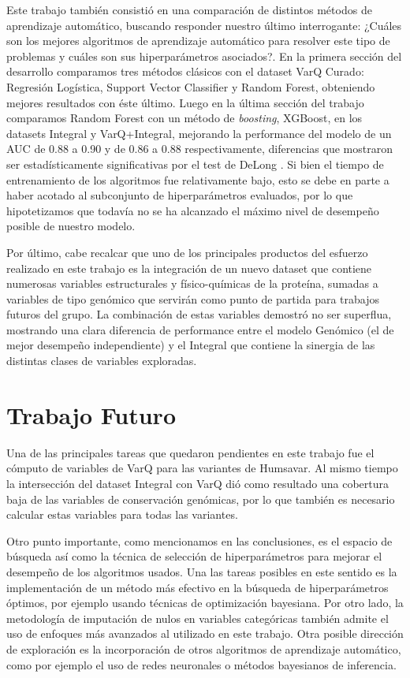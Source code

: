 Este trabajo también consistió en una comparación de distintos métodos de aprendizaje automático, buscando responder nuestro último interrogante: ¿Cuáles son los mejores algoritmos de aprendizaje automático para resolver este tipo de problemas y cuáles son sus hiperparámetros asociados?. En la primera sección del desarrollo comparamos tres métodos clásicos con el dataset VarQ Curado: Regresión Logística, Support Vector Classifier y Random Forest, obteniendo mejores resultados con éste último. Luego en la última sección del trabajo comparamos Random Forest con un método de \textit{boosting}, XGBoost, en los datasets Integral y VarQ+Integral, mejorando la performance del modelo de un AUC de 0.88 a 0.90 y de 0.86 a 0.88 respectivamente, diferencias que mostraron ser estadísticamente significativas por el test de DeLong \cite{DeLong}. Si bien el tiempo de entrenamiento de los algoritmos fue relativamente bajo, esto se debe en parte  a haber acotado al subconjunto de hiperparámetros evaluados, por lo que hipotetizamos que todavía no se ha alcanzado el máximo nivel de desempeño posible de nuestro modelo.  

Por último, cabe recalcar que uno de los principales productos del esfuerzo realizado en este trabajo es la integración de un nuevo dataset que contiene numerosas variables estructurales y físico-químicas de la proteína, sumadas a variables de tipo genómico que servirán como punto de partida para trabajos futuros del grupo. La combinación de estas variables demostró no ser superflua, mostrando una clara diferencia de performance entre el modelo Genómico (el de mejor desempeño independiente) y el Integral que contiene la sinergia de las distintas clases de variables exploradas.

\section{Trabajo Futuro}

Una de las principales tareas que quedaron pendientes en este trabajo fue el cómputo de variables de VarQ para las variantes de Humsavar. Al mismo tiempo la intersección del dataset Integral con VarQ dió como resultado una cobertura baja de las variables de conservación genómicas, por lo que también es necesario calcular estas variables para todas las variantes. 

Otro punto importante, como mencionamos en las conclusiones, es el espacio de búsqueda así como la técnica de selección de hiperparámetros para mejorar el desempeño de los algoritmos usados. Una las tareas posibles en este sentido es la implementación de un método más efectivo en la búsqueda de hiperparámetros óptimos, por ejemplo usando técnicas de optimización bayesiana. Por otro lado, la metodología de imputación de nulos en variables categóricas también admite el uso de enfoques más avanzados al utilizado en este trabajo. Otra posible dirección de exploración es la incorporación  de otros algoritmos de aprendizaje automático, como por ejemplo el uso de redes neuronales o métodos bayesianos de inferencia. 

